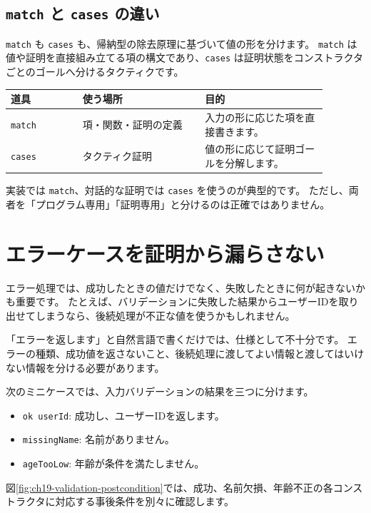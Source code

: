 \subsection{\texttt{match} と \texttt{cases} の違い}

\texttt{match} も \texttt{cases} も、帰納型の除去原理に基づいて値の形を分けます。
\texttt{match} は値や証明を直接組み立てる項の構文であり、\texttt{cases} は証明状態をコンストラクタごとのゴールへ分けるタクティクです。

\begin{center}
\begin{tabular}{p{0.20\linewidth}p{0.34\linewidth}p{0.34\linewidth}}
\toprule
道具 & 使う場所 & 目的 \\
\midrule
\texttt{match} & 項・関数・証明の定義 & 入力の形に応じた項を直接書きます。 \\
\texttt{cases} & タクティク証明 & 値の形に応じて証明ゴールを分解します。 \\
\bottomrule
\end{tabular}
\end{center}

実装では \texttt{match}、対話的な証明では \texttt{cases} を使うのが典型的です。
ただし、両者を「プログラム専用」「証明専用」と分けるのは正確ではありません。

\section{エラーケースを証明から漏らさない}

エラー処理では、成功したときの値だけでなく、失敗したときに何が起きないかも重要です。
たとえば、バリデーションに失敗した結果からユーザーIDを取り出せてしまうなら、後続処理が不正な値を使うかもしれません。

「エラーを返します」と自然言語で書くだけでは、仕様として不十分です。
エラーの種類、成功値を返さないこと、後続処理に渡してよい情報と渡してはいけない情報を分ける必要があります。

次のミニケースでは、入力バリデーションの結果を三つに分けます。

\begin{itemize}
\item \texttt{ok userId}: 成功し、ユーザーIDを返します。
\item \texttt{missingName}: 名前がありません。
\item \texttt{ageTooLow}: 年齢が条件を満たしません。
\end{itemize}

図\ref{fig:ch19-validation-postcondition}では、成功、名前欠損、年齢不正の各コンストラクタに対応する事後条件を別々に確認します。

